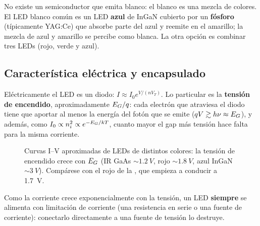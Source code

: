 \begin{ojo}
No existe un semiconductor que emita blanco: el blanco es una mezcla de colores. El LED
blanco común es un LED \textbf{azul} de InGaN cubierto por un \textbf{fósforo} (típicamente
YAG:Ce) que absorbe parte del azul y reemite en el amarillo; la mezcla de azul y amarillo
se percibe como blanca. La otra opción es combinar tres LEDs (rojo, verde y azul).
\end{ojo}

\subsection{Característica eléctrica y encapsulado}

Eléctricamente el LED es un diodo: $I\approx I_0e^{V/(nV_T)}$. Lo particular es la
\textbf{tensión de encendido}, aproximadamente $E_G/q$: cada electrón que atraviesa el
diodo tiene que aportar al menos la energía del fotón que se emite ($qV\gtrsim h\nu\approx
E_G$), y además, como $I_0\propto n_i^2\propto e^{-E_G/kT}$, cuanto mayor el gap más tensión
hace falta para la misma corriente.

\begin{figure}[H]
\centering
{}
\caption{Curvas I--V aproximadas de LEDs de distintos colores: la tensión de encendido
crece con $E_G$ (IR GaAs $\sim\SI{1.2}{V}$, rojo $\sim\SI{1.8}{V}$, azul InGaN
$\sim\SI{3}{V}$). Compárese con el rojo de la , que empieza a conducir a
\SI{1.7}{V}.}
\label{fig:led-iv}
\end{figure}

Como la corriente crece exponencialmente con la tensión, un LED \textbf{siempre} se
alimenta con limitación de corriente (una resistencia en serie o una fuente de corriente):
conectarlo directamente a una fuente de tensión lo destruye.

